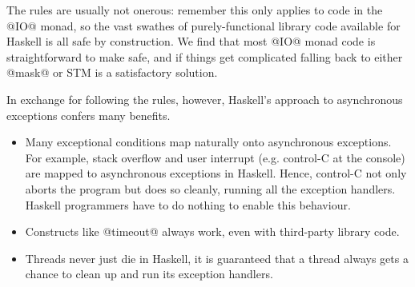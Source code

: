 The rules are usually not onerous: remember this only applies to code
in the @IO@ monad, so the vast swathes of purely-functional library
code available for Haskell is all safe by construction.  We find that
most @IO@ monad code is straightforward to make safe, and if things
get complicated falling back to either @mask@ or STM is a satisfactory
solution.

In exchange for following the rules, however, Haskell's approach to
asynchronous exceptions confers many benefits.

\begin{itemize}
\item Many exceptional conditions map naturally onto asynchronous
  exceptions.  For example, stack overflow and user interrupt
  (e.g. control-C at the console) are mapped to asynchronous
  exceptions in Haskell.  Hence, control-C not only aborts the program
  but does so cleanly, running all the exception handlers.  Haskell
  programmers have to do nothing to enable this behaviour.

\item Constructs like @timeout@ always work, even with third-party
  library code.

\item Threads never just die in Haskell, it is guaranteed that a
  thread always gets a chance to clean up and run its exception
  handlers.
\end{itemize}


